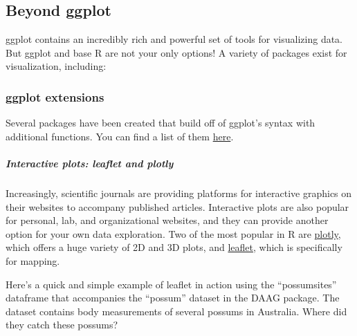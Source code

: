 \documentclass[
]{article}
\newenvironment{Shaded}{\begin{snugshade}}{\end{snugshade}}
\newcommand{\AttributeTok}[1]{\textcolor[rgb]{0.13,0.29,0.53}{#1}}
\newcommand{\CommentTok}[1]{\textcolor[rgb]{0.56,0.35,0.01}{\textit{#1}}}
\newcommand{\FunctionTok}[1]{\textcolor[rgb]{0.13,0.29,0.53}{\textbf{#1}}}
\newcommand{\NormalTok}[1]{#1}
\newcommand{\SpecialCharTok}[1]{\textcolor[rgb]{0.81,0.36,0.00}{\textbf{#1}}}
\begin{document}
\hypertarget{beyond-ggplot}{%
\subsection{Beyond ggplot}\label{beyond-ggplot}}

ggplot contains an incredibly rich and powerful set of tools for
visualizing data. But ggplot and base R are not your only options! A
variety of packages exist for visualization, including:

\hypertarget{ggplot-extensions}{%
\subsubsection{ggplot extensions}\label{ggplot-extensions}}

Several packages have been created that build off of ggplot's syntax
with additional functions. You can find a list of them
\href{https://exts.ggplot2.tidyverse.org/gallery/}{here}.

\hypertarget{interactive-plots-leaflet-and-plotly}{%
\subparagraph{Interactive plots: leaflet and
plotly}\label{interactive-plots-leaflet-and-plotly}}

Increasingly, scientific journals are providing platforms for
interactive graphics on their websites to accompany published articles.
Interactive plots are also popular for personal, lab, and organizational
websites, and they can provide another option for your own data
exploration. Two of the most popular in R are
\href{https://plot.ly/r/}{plotly}, which offers a huge variety of 2D and
3D plots, and \href{https://rstudio.github.io/leaflet/}{leaflet}, which
is specifically for mapping.

Here's a quick and simple example of leaflet in action using the
``possumsites'' dataframe that accompanies the ``possum'' dataset in the
DAAG package. The dataset contains body measurements of several possums
in Australia. Where did they catch these possums?

\begin{Shaded}
\end{Shaded}
\end{document}
